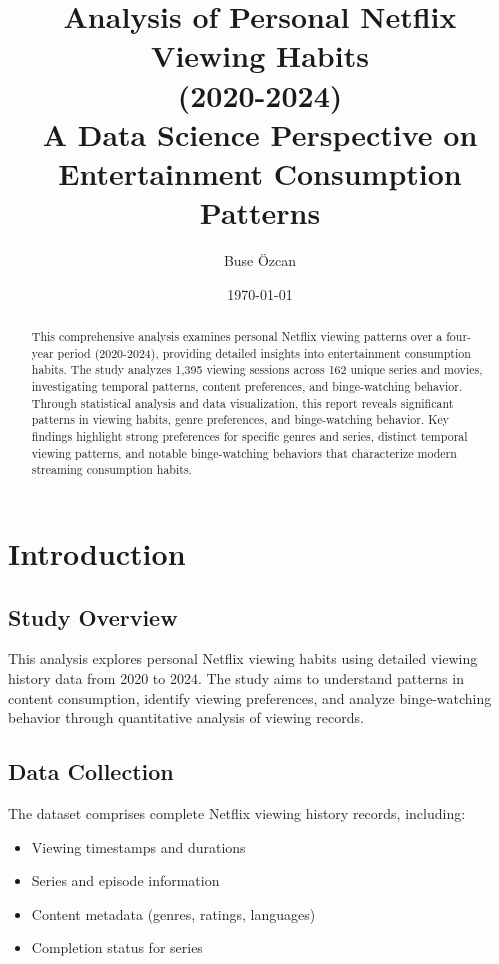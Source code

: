 \documentclass[12pt]{article}
\title{\textbf{Analysis of Personal Netflix Viewing Habits\\(2020-2024)}\\
\large A Data Science Perspective on Entertainment Consumption Patterns}
\author{Buse Özcan}
\date{\today}
\begin{document}
\maketitle
\thispagestyle{empty}

\begin{abstract}
This comprehensive analysis examines personal Netflix viewing patterns over a four-year period (2020-2024), providing detailed insights into entertainment consumption habits. The study analyzes 1,395 viewing sessions across 162 unique series and movies, investigating temporal patterns, content preferences, and binge-watching behavior. Through statistical analysis and data visualization, this report reveals significant patterns in viewing habits, genre preferences, and binge-watching behavior. Key findings highlight strong preferences for specific genres and series, distinct temporal viewing patterns, and notable binge-watching behaviors that characterize modern streaming consumption habits.
\end{abstract}

\newpage
\tableofcontents
\newpage

\section{Introduction}
\subsection{Study Overview}
This analysis explores personal Netflix viewing habits using detailed viewing history data from 2020 to 2024. The study aims to understand patterns in content consumption, identify viewing preferences, and analyze binge-watching behavior through quantitative analysis of viewing records.

\subsection{Data Collection}
The dataset comprises complete Netflix viewing history records, including:
\begin{itemize}[noitemsep]
    \item Viewing timestamps and durations
    \item Series and episode information
    \item Content metadata (genres, ratings, languages)
    \item Completion status for series
\end{itemize}
\end{document}
